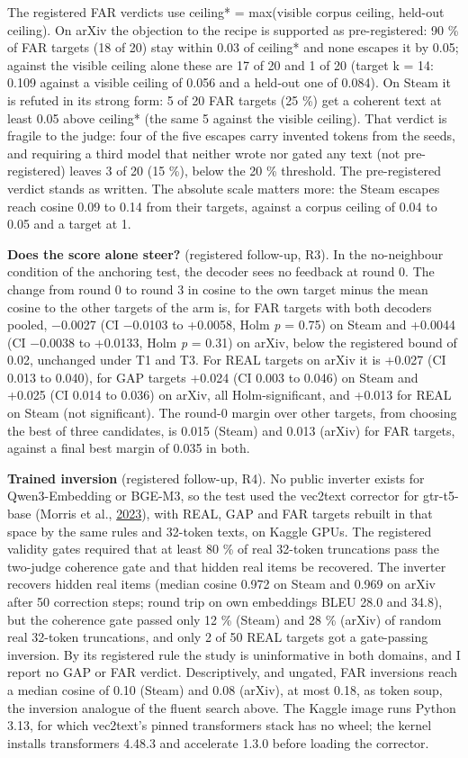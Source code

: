 \documentclass[
  10pt,
]{article}
\begin{document}
The registered FAR verdicts use ceiling*
= max(visible corpus ceiling, held-out
ceiling). On arXiv the objection to the
recipe is supported as pre-registered:
90 \% of FAR targets (18 of 20) stay
within 0.03 of ceiling* and none escapes
it by 0.05; against the visible ceiling
alone these are 17 of 20 and 1 of 20
(target k = 14: 0.109 against a visible
ceiling of 0.056 and a held-out one of
0.084). On Steam it is refuted in its
strong form: 5 of 20 FAR targets (25 \%)
get a coherent text at least 0.05 above
ceiling* (the same 5 against the visible
ceiling). That verdict is fragile to the
judge: four of the five escapes carry
invented tokens from the seeds, and
requiring a third model that neither
wrote nor gated any text (not
pre-registered) leaves 3 of 20 (15 \%),
below the 20 \% threshold. The
pre-registered verdict stands as
written. The absolute scale matters
more: the Steam escapes reach cosine
0.09 to 0.14 from their targets, against
a corpus ceiling of 0.04 to 0.05 and a
target at 1.

\textbf{Does the score alone steer?}
(registered follow-up, R3). In the
no-neighbour condition of the anchoring
test, the decoder sees no feedback at
round 0. The change from round 0 to
round 3 in cosine to the own target
minus the mean cosine to the other
targets of the arm is, for FAR targets
with both decoders pooled, −0.0027 (CI
−0.0103 to +0.0058, Holm \emph{p} =
0.75) on Steam and +0.0044 (CI −0.0038
to +0.0133, Holm \emph{p} = 0.31) on
arXiv, below the registered bound of
0.02, unchanged under T1 and T3. For
REAL targets on arXiv it is +0.027 (CI
0.013 to 0.040), for GAP targets +0.024
(CI 0.003 to 0.046) on Steam and +0.025
(CI 0.014 to 0.036) on arXiv, all
Holm-significant, and +0.013 for REAL on
Steam (not significant). The round-0
margin over other targets, from choosing
the best of three candidates, is 0.015
(Steam) and 0.013 (arXiv) for FAR
targets, against a final best margin of
0.035 in both.

\textbf{Trained inversion} (registered
follow-up, R4). No public inverter
exists for Qwen3-Embedding or BGE-M3, so
the test used the vec2text corrector for
gtr-t5-base (Morris et al.,
\hyperlink{ref-Morris2023}{2023}), with
REAL, GAP and FAR targets rebuilt in
that space by the same rules and
32-token texts, on Kaggle GPUs. The
registered validity gates required that
at least 80 \% of real 32-token
truncations pass the two-judge coherence
gate and that hidden real items be
recovered. The inverter recovers hidden
real items (median cosine 0.972 on Steam
and 0.969 on arXiv after 50 correction
steps; round trip on own embeddings BLEU
28.0 and 34.8), but the coherence gate
passed only 12 \% (Steam) and 28 \%
(arXiv) of random real 32-token
truncations, and only 2 of 50 REAL
targets got a gate-passing inversion. By
its registered rule the study is
uninformative in both domains, and I
report no GAP or FAR verdict.
Descriptively, and ungated, FAR
inversions reach a median cosine of 0.10
(Steam) and 0.08 (arXiv), at most 0.18,
as token soup, the inversion analogue of
the fluent search above. The Kaggle
image runs Python 3.13, for which
vec2text's pinned transformers stack has
no wheel; the kernel installs
transformers 4.48.3 and accelerate 1.3.0
before loading the corrector.
\end{document}
